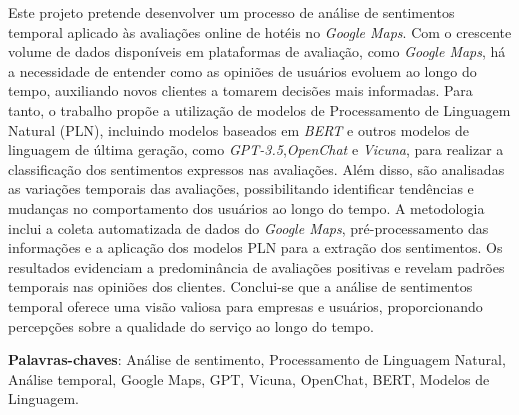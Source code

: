 
\setlength{\absparsep}{18pt} %
\begin{resumo}

Este projeto pretende desenvolver um processo de análise de sentimentos temporal aplicado às avaliações online de hotéis no \textit{Google Maps}. Com o crescente volume de dados disponíveis em plataformas de avaliação, como \textit{Google Maps}, há a necessidade de entender como as opiniões de usuários evoluem ao longo do tempo, auxiliando novos clientes a tomarem decisões mais informadas. Para tanto, o trabalho propõe a utilização de modelos de Processamento de Linguagem Natural (PLN), incluindo modelos baseados em \textit{BERT} e outros modelos de linguagem de última geração, como \textit{GPT-3.5},\textit{OpenChat} e \textit{Vicuna}, para realizar a classificação dos sentimentos expressos nas avaliações. Além disso, são analisadas as variações temporais das avaliações, possibilitando identificar tendências e mudanças no comportamento dos usuários ao longo do tempo. A metodologia inclui a coleta automatizada de dados do \textit{Google Maps}, pré-processamento das informações e a aplicação dos modelos PLN para a extração dos sentimentos. Os resultados evidenciam a predominância de avaliações positivas e revelam padrões temporais nas opiniões dos clientes. Conclui-se que a análise de sentimentos temporal oferece uma visão valiosa para empresas e usuários, proporcionando percepções sobre a qualidade do serviço ao longo do tempo.



 \textbf{Palavras-chaves}: Análise de sentimento, Processamento de Linguagem Natural, Análise temporal, Google Maps, GPT, Vicuna, OpenChat, BERT, Modelos de Linguagem.
\end{resumo}

